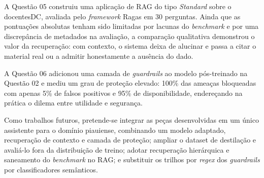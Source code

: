 A Questão 05 construiu uma aplicação de RAG do tipo \textit{Standard} sobre o
docentesDC, avaliada pelo \textit{framework} Ragas em 30 perguntas. Ainda que as
pontuações absolutas tenham sido limitadas por lacunas do \textit{benchmark} e por uma
discrepância de metadados na avaliação, a comparação qualitativa demonstrou o valor da
recuperação: com contexto, o sistema deixa de alucinar e passa a citar o material real
ou a admitir honestamente a ausência do dado.

A Questão 06 adicionou uma camada de \textit{guardrails} ao modelo pós-treinado na
Questão 02 e mediu um grau de proteção elevado: 100\% das ameaças bloqueadas com
apenas 5\% de falsos positivos e 95\% de disponibilidade, endereçando na prática o
dilema entre utilidade e segurança.

Como trabalhos futuros, pretende-se integrar as peças desenvolvidas em um único
assistente para o domínio piauiense, combinando um modelo adaptado, recuperação de
contexto e camada de proteção; ampliar o dataset de destilação e avaliá-lo fora da
distribuição de treino; adotar recuperação hierárquica e saneamento do
\textit{benchmark} no RAG; e substituir os trilhos por \textit{regex} dos
\textit{guardrails} por classificadores semânticos.

